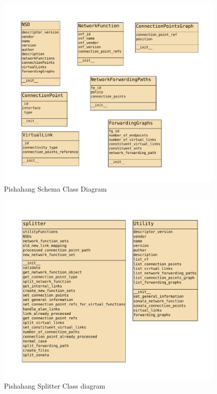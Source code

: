 \begin{figure}
	\centering
	\includegraphics[width=1\linewidth]{figures/pishahang-schema}
	\caption{Pishahang Schema Class Diagram}
	\label{fig:pishahangschemaclassdiagram}
\end{figure}

\begin{figure}
	\centering
	\includegraphics[width=1\linewidth]{figures/Pishahang-Splitter}
	\caption{Pishahang Splitter Class diagram}
	\label{fig:pishahangsplitterclassdiagram}
\end{figure}

